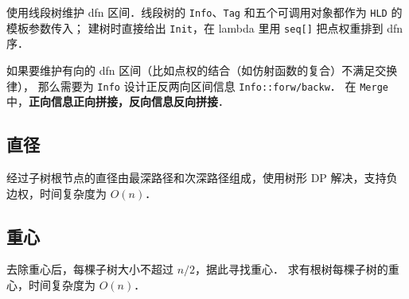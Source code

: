 使用线段树维护 dfn 区间．线段树的 {\tt Info}、{\tt Tag} 和五个可调用对象都作为 {\tt HLD} 的模板参数传入；
建树时直接给出 {\tt Init}，在 lambda 里用 {\tt seq[]} 把点权重排到 dfn 序．



如果要维护有向的 dfn 区间（比如点权的结合（如仿射函数的复合）不满足交换律），
那么需要为 {\tt Info} 设计正反两向区间信息 {\tt Info::forw/backw}．
在 {\tt Merge} 中，{\bf 正向信息正向拼接，反向信息反向拼接}．



\newpage

\subsection{直径}

经过子树根节点的直径由最深路径和次深路径组成，使用树形 DP 解决，支持负边权，时间复杂度为 $O(n)$．



\subsection{重心}

去除重心后，每棵子树大小不超过 $n / 2$，据此寻找重心．
求有根树每棵子树的重心，时间复杂度为 $O(n)$．



\newpage
